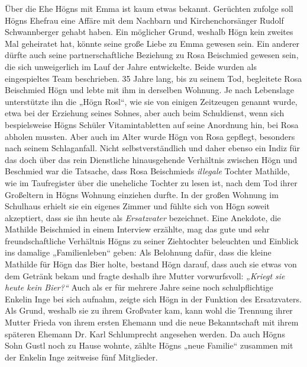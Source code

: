 \documentclass{book}
\newcommand{\zitat}[1]{\textit{#1}}
\begin{document}
Über die Ehe Högns mit Emma ist kaum etwas bekannt. Gerüchten zufol\-ge
soll Högns Ehefrau eine Affäre mit dem Nachbarn und Kirchenchor\-sänger
Rudolf Schwannberger gehabt haben. Ein möglicher Grund, weshalb Högn
kein zweites Mal geheiratet hat, könnte seine große Liebe zu Emma
gewesen sein. Ein anderer dürfte auch seine partnerschaftliche
Beziehung zu Rosa Beischmied gewesen sein, die sich unweigerlich im
Lauf der Jahre ent\-wickelte. Beide wurden als eingespieltes Team
beschrieben. 35 Jahre lang, bis zu seinem Tod, begleitete Rosa
Beischmied Högn und lebte mit ihm in derselben Wohnung. Je nach
Lebenslage unterstützte ihn die „Högn Rosl“, wie sie von einigen
Zeitzeugen genannt wurde, etwa bei der Erziehung seines Sohnes, aber
auch beim Schuldienst, wenn sich bespielsweise Högns Schüler
Vitamintabletten auf seine Anordnung hin, bei Rosa abholen mussten.
Aber auch im Alter wurde Högn von Rosa gepflegt, besonders nach seinem
Schlag\-anfall. Nicht selbstverständlich und daher ebenso ein Indiz für
das doch über das rein Dienstliche hinausgehende Verhältnis zwischen
Högn und Beschmied war die Tatsache, dass Rosa Beischmieds
\textit{illegale} Tochter Mathilde, wie im Taufregister über die
uneheliche Tochter zu lesen ist, nach dem Tod ihrer Großeltern in Högns
Wohnung einziehen durfte. In der großen Wohnung im Schulhaus erhielt
sie ein eigenes Zimmer und fühlte sich von Högn soweit akzeptiert, dass
sie ihn heute als \textit{Ersatzvater} bezeichnet. Eine Anekdote, die
Mathilde Beischmied in einem Interview erzählte, mag das gute und sehr
freundschaftliche Verhältnis Högns zu seiner Ziehtochter beleuchten und
Einblick ins damalige „Familienleben“ geben: Als Belohnung dafür, dass
die kleine Mathilde für Högn das Bier holte, bestand Högn darauf, dass
auch sie etwas von dem Getränk bekam und fragte deshalb ihre Mutter
vorwurfsvoll: \zitat{\textup{„Kriegt sie heute kein Bier?“}
}Auch als er für mehrere Jahre seine noch schul\-pflichtige Enkelin
Inge bei sich aufnahm, zeigte sich Högn in der Funktion des
Ersatzvaters. Als Grund, weshalb sie zu ihrem Großvater kam, kann wohl
die Trennung ihrer Mutter Frieda von ihrem ersten Ehemann und die neue
Be\-kanntschaft mit ihrem späteren Ehemann Dr. Karl Schlumprecht
angesehen werden. Da auch Högns Sohn Gustl noch zu Hause wohnte, zählte
Högns „neue Familie“ zusammen mit der Enkelin Inge zeitweise fünf
Mitglieder.
\end{document}

